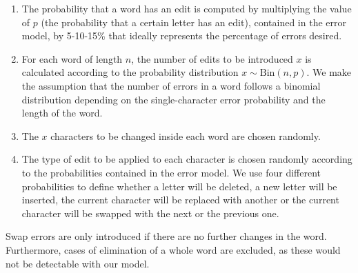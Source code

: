 \begin{enumerate}
	\item The probability that a word has an edit is computed by multiplying the value of $p$ (the probability that a 
	certain letter has an edit), contained in the error model, by \num{5}-\num{10}-\num{15}\% that ideally 
	represents the percentage of errors desired.
	\item For each word of length $n$, the number of edits to be introduced $x$ is calculated according to the 
	probability distribution $x \sim \text{Bin}(n, p)$. We make the assumption that the number of errors in a word 
	follows a binomial distribution depending on the single-character error probability and the length of the word. 
	\item The $x$ characters to be changed inside each word are chosen randomly.
	\item The type of edit to be applied to each character is chosen randomly according to the probabilities contained 
	in the error model. We use four different probabilities to define whether a letter will be deleted, a new letter 
	will be inserted, the current character will be replaced with another or the current character will be swapped with 
	the next or the previous one.
	
\end{enumerate}

Swap errors are only introduced if there are no further changes in the word. Furthermore, cases of elimination of a 
whole word are excluded, as these would not be detectable with our model.




